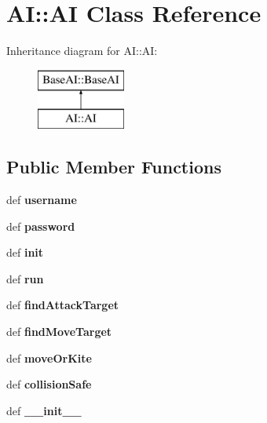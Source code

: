 \hypertarget{classAI_1_1AI}{
\section{AI::AI Class Reference}
\label{classAI_1_1AI}
}
Inheritance diagram for AI::AI:\begin{figure}[H]
\begin{center}
\leavevmode
\includegraphics[height=2cm]{classAI_1_1AI}
\end{center}
\end{figure}
\subsection*{Public Member Functions}
\begin{DoxyCompactItemize}
\item 
\hypertarget{classAI_1_1AI_a1173d35565e571260327628b5fdbf601}{
def {\bfseries username}}
\label{classAI_1_1AI_a1173d35565e571260327628b5fdbf601}

\item 
\hypertarget{classAI_1_1AI_a0c68d55972c20f5b5c12b3413dccf4f8}{
def {\bfseries password}}
\label{classAI_1_1AI_a0c68d55972c20f5b5c12b3413dccf4f8}

\item 
\hypertarget{classAI_1_1AI_abe85fa052f61e71327d0f066866360ec}{
def {\bfseries init}}
\label{classAI_1_1AI_abe85fa052f61e71327d0f066866360ec}

\item 
\hypertarget{classAI_1_1AI_a0e95ce8db48896cbf1dcf410930ca141}{
def {\bfseries run}}
\label{classAI_1_1AI_a0e95ce8db48896cbf1dcf410930ca141}

\item 
\hypertarget{classAI_1_1AI_a98bd949e1d0d87db3c02a1453415f73e}{
def {\bfseries findAttackTarget}}
\label{classAI_1_1AI_a98bd949e1d0d87db3c02a1453415f73e}

\item 
\hypertarget{classAI_1_1AI_a0d332a883d380a3c4325d766eb66b911}{
def {\bfseries findMoveTarget}}
\label{classAI_1_1AI_a0d332a883d380a3c4325d766eb66b911}

\item 
\hypertarget{classAI_1_1AI_abd85a17fab96a0abe54bae971206824f}{
def {\bfseries moveOrKite}}
\label{classAI_1_1AI_abd85a17fab96a0abe54bae971206824f}

\item 
\hypertarget{classAI_1_1AI_a0d31a8b32480e4b425061ecf4c01f476}{
def {\bfseries collisionSafe}}
\label{classAI_1_1AI_a0d31a8b32480e4b425061ecf4c01f476}

\item 
\hypertarget{classAI_1_1AI_afc336c04d31701982b4aa115de277f2a}{
def {\bfseries \_\-\_\-init\_\-\_\-}}
\label{classAI_1_1AI_afc336c04d31701982b4aa115de277f2a}

\end{DoxyCompactItemize}

